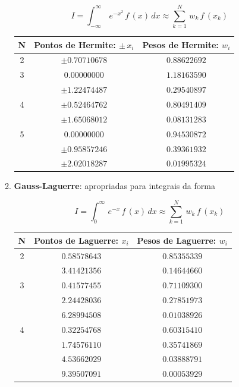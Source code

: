 \begin{enumerate}
\begin{enumerate}
\[
 I = \int_{-\infty}^\infty \, e^{-x^2} \, f\,(x) \, dx \approx \sum_{k=1}^N \, w_k \, f\,(x_k)
\]

{
\footnotesize
	\begin{center}
		\begin{tabular}{|c|c|c|}
		\hline		
		\textbf{N} & \textbf{Pontos de Hermite: $\pm \, x_i$} & \textbf{Pesos de Hermite: $w_i$} \\
		\hline \hline
		2 & $\pm 0.70710678$ & $0.88622692$ \\
		\hline
		3 & $0.00000000$     & $1.18163590$ \\
		  & $\pm 1.22474487$ & $0.29540897$ \\
		\hline
		4 & $\pm 0.52464762$ & $0.80491409$ \\
		  & $\pm 1.65068012$ & $0.08131283$ \\
		\hline
		5 & $    0.00000000$ & $0.94530872$ \\
		  & $\pm 0.95857246$ & $0.39361932$ \\
		  & $\pm 2.02018287$ & $0.01995324$ \\
		\hline
		\end{tabular}
	\end{center}
	\label{cap2:sec6:tab2}
}

\item
\textbf{Gauss-Laguerre}: apropriadas para integrais da forma

\[
 I = \int_0^\infty \, e^{-x} \, f\,(x) \, dx \approx \sum_{k=1}^N \, w_k \, f\,(x_k)
\]

{
\footnotesize
	\begin{center}
		\begin{tabular}{|c|c|c|}
		\hline		
		\textbf{N} & \textbf{Pontos de Laguerre: $x_i$} & \textbf{Pesos de Laguerre: $w_i$} \\
		\hline \hline
		2 & $0.58578643$ & $0.85355339$ \\
		  & $3.41421356$ & $0.14644660$ \\
		\hline
		3 & $0.41577455$ & $0.71109300$ \\
		  & $2.24428036$ & $0.27851973$ \\
		  & $6.28994508$ & $0.01038926$ \\
		\hline
		4 & $0.32254768$ & $0.60315410$ \\
		  & $1.74576110$ & $0.35741869$ \\
		  & $4.53662029$ & $0.03888791$ \\
		  & $9.39507091$ & $0.00053929$ \\
		\hline
		\end{tabular}
	\end{center}
	\label{cap2:sec6:tab3}
}


\end{enumerate}
\end{enumerate}
